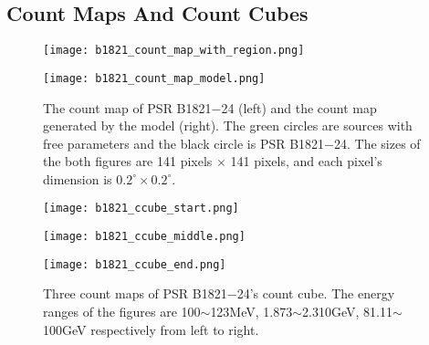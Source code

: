\documentclass[a4paper, 12pt]{report}
\begin{document}
    \subsection{Count Maps And Count Cubes}
      \begin{figure}[!ht]
        \begin{center}
        \begin{minipage}{0.45\textwidth}
          \centering 
          \texttt{[image: b1821\_count\_map\_with\_region.png]}
        \end{minipage}
        \begin{minipage}{0.45\textwidth}
          \centering
          \texttt{[image: b1821\_count\_map\_model.png]}
        \end{minipage}
      \end{center}
      \caption[The count map of PSR B1821$-$24 (left) and the count map generated by 
              the model (right).]
        {The count map of PSR B1821$-$24 (left) and the count map generated by 
        the model (right). The green circles are sources with free parameters and the black circle
        is PSR B1821$-$24. The sizes of the both figures are 141 pixels $\times$ 141 pixels, and 
        each pixel's dimension is $0.2^\circ \times 0.2^\circ$.}
      \label{fig: b1821_count_map_with_region_and_model}
      \end{figure}
  
      \begin{figure}[!ht]
        \begin{center}
          \begin{minipage}{0.31\textwidth}
            \begin{center} 
              \texttt{[image: b1821\_ccube\_start.png]}
            \end{center}
          \end{minipage}
          \begin{minipage}{0.31\textwidth}
            \begin{center}
              \texttt{[image: b1821\_ccube\_middle.png]}
            \end{center}
          \end{minipage}
          \begin{minipage}{0.31\textwidth}
            \begin{center}
            \texttt{[image: b1821\_ccube\_end.png]}
            \end{center}
          \end{minipage}
          \end{center}
          \caption[Three count maps of PSR B1821$-$24's count cube.]
            {Three count maps of PSR B1821$-$24's count cube. The energy ranges of the 
            figures are 100$\sim$123MeV, 1.873$\sim$2.310GeV, 81.11$\sim$100GeV respectively from 
            left to right.}
          \label{fig: b1821_ccube_1_15_33.png}
      \end{figure}
\end{document}
